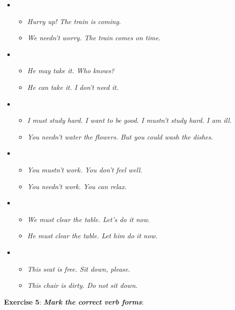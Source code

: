 \begin{itemize} 

\item
\begin{itemize}
\item \textit{Hurry up! The train is coming}.
\item \textit{We needn't worry. The train comes on time}.
\end{itemize}

\item
\begin{itemize}
\item \textit{He may take it. Who knows?}
\item \textit{He can take it. I don't need it}.
\end{itemize}

\item
\begin{itemize}
\item \textit{I must study hard. I want to be good. I mustn't study hard. I am ill}.
\item \textit{You needn't water the flowers. But you could wash the dishes}.
\end{itemize}

\item
\begin{itemize}
\item \textit{You mustn't work. You don't feel well}.
\item \textit{You needn't work. You can relax}.
\end{itemize}

\item
\begin{itemize}
\item \textit{We must clear the table. Let's do it now}.
\item \textit{He must clear the table. Let him do it now}.
\end{itemize}

\item
\begin{itemize}
\item \textit{This seat is free. Sit down, please}.
\item \textit{This chair is dirty. Do not sit down}.
\end{itemize}

\end{itemize}

\textbf{Exercise 5}: \textit{\textbf{Mark the correct verb forms}}:


